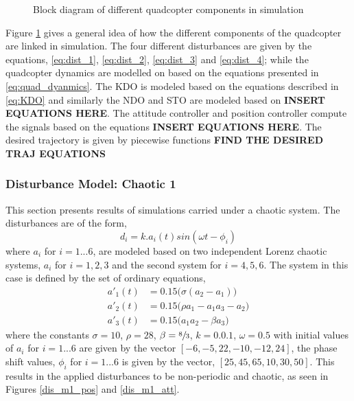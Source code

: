 \documentclass{article}
\begin{document}
\begin{figure}
	\centerline{}
	\caption{Block diagram of different quadcopter components in simulation}	
	\label{block_simulation}
\end{figure}
Figure \ref{block_simulation} gives a general idea of how the different components of the quadcopter are linked in simulation. The four different disturbances are given by the equations, \eqref{eq:dist_1}, \eqref{eq:dist_2}, \eqref{eq:dist_3} and \eqref{eq:dist_4}; while the quadcopter dynamics are modelled on based on the equations presented in \eqref{eq:quad_dyanmics}. The KDO is modeled based on the equations described in \eqref{eq:KDO} and similarly the NDO and STO are modeled based on \textbf{INSERT EQUATIONS HERE}. The attitude controller and position controller compute the signals based on the equations \textbf{INSERT EQUATIONS HERE}. The desired trajectory is given by piecewise functions \textbf{FIND THE DESIRED TRAJ EQUATIONS}

\subsubsection{Disturbance Model: Chaotic 1}
This section presents results of simulations carried under a chaotic system. The disturbances are of the form,
\begin{equation}
d_i = k.a_i(t)sin(\omega t-\phi_i)
\label{eq:dist_1}
\end{equation}
where $a_i$ for $i=1...6$, are modeled based on two independent Lorenz chaotic systems, $a_i$ for $i=1,2,3$ and the second system for $i=4,5,6$. The system in this case is defined by the set of ordinary equations, 
\begin{subequations}
\begin{align}
a'_1(t) &= 0.15\big(\sigma(a_2-a_1)\big)\\
a'_2(t) &= 0.15\big(\rho a_1 - a_1 a_3 - a_2\big)\\
a'_3(t) &= 0.15\big(a_1 a_2 - \beta a_3\big)
\end{align}
\end{subequations}
where the constants $\sigma=10$, $\rho=28$, $\beta=\sfrac{8}{3}$, $k=0.0.1$, $\omega=0.5$ with initial values of $a_i$ for $i=1...6$ are given by the vector $[-6,-5,22,-10,-12,24]$, the phase shift values, $\phi_i$ for $i=1...6$ is given by the vector, $[25,45,65,10,30,50]$. This results in the applied disturbances to be non-periodic and chaotic, as seen in Figures \ref{dis_m1_pos} and \ref{dis_m1_att}.
\end{document}
